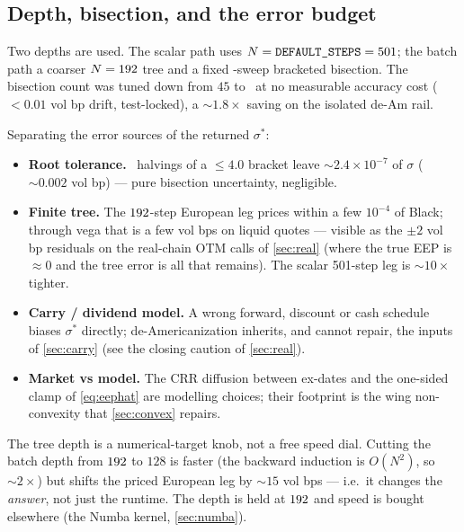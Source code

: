 \documentclass[11pt]{article}
\begin{document}
\subsection{Depth, bisection, and the error budget}

Two depths are used. The scalar path uses $N=\text{\texttt{DEFAULT\_STEPS}}=501$;
the batch path a coarser $N=192$ tree and a fixed \deambisect-sweep
bracketed bisection. The bisection count was tuned down from $45$ to
\deambisect\ at no measurable accuracy cost ($<0.01$ vol bp drift, test-locked),
a $\sim1.8\times$ saving on the isolated de-Am rail.

Separating the error sources of the returned $\sigma^*$:
\begin{itemize}[leftmargin=1.6em,itemsep=1pt]
\item \textbf{Root tolerance.} \deambisect\ halvings of a $\le4.0$ bracket leave
$\sim2.4\times10^{-7}$ of $\sigma$ ($\sim0.002$ vol bp) --- pure bisection
uncertainty, negligible.
\item \textbf{Finite tree.} The $192$-step European leg prices within a
few $10^{-4}$ of Black; through vega that is a few vol bps on liquid quotes ---
visible as the $\pm2$ vol bp residuals on the real-chain OTM calls of
\cref{sec:real} (where the true EEP is $\approx0$ and the tree error is all
that remains). The scalar 501-step leg is $\sim10\times$ tighter.
\item \textbf{Carry / dividend model.} A wrong forward, discount or cash
schedule biases $\sigma^*$ directly; de-Americanization inherits, and cannot
repair, the inputs of \cref{sec:carry} (see the closing caution of
\cref{sec:real}).
\item \textbf{Market vs model.} The CRR diffusion between ex-dates and the
one-sided clamp of \cref{eq:eephat} are modelling choices; their footprint is
the wing non-convexity that \cref{sec:convex} repairs.
\end{itemize}

\begin{caution}
The tree depth is a numerical-target knob, not a free speed dial. Cutting the
batch depth from $192$ to $128$ is faster (the backward induction is
$O(N^2)$, so $\sim2\times$) but shifts the priced European leg by $\sim15$ vol
bps --- i.e.\ it changes the \emph{answer}, not just the runtime. The depth is
held at $192$ and speed is bought elsewhere (the Numba kernel,
\cref{sec:numba}).
\end{caution}

\end{document}
